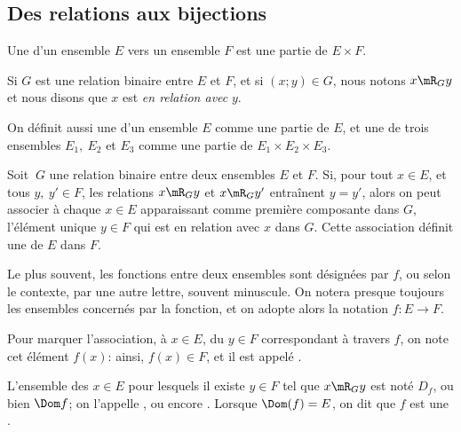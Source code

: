 \subsection{Des relations aux bijections}
\label{SUBooRelFctBijections}

\begin{definition}        \label{DEFooRFVTooUUuFuE}
	Une  d'un ensemble \( E\) vers un ensemble \( F\) est une partie de \( E\times F\).

	Si \( G\) est une relation binaire entre \( E\) et \( F\), et si \( (x; y) \in G \), nous notons \( x\mR_G y\) et nous disons que \( x\) est \emph{en relation avec} \( y\).

	On définit aussi une  d'un ensemble \( E \) comme une partie de \( E \), et une  de trois ensembles \( E_1,\ E_2 \) et \( E_3 \) comme une partie de \( E_1 \times E_2 \times E_3 \).
\end{definition}

\begin{definition}\label{DefooApplicFct}
	Soit \(\ G\) une relation binaire entre deux ensembles \(E\) et \( F\). Si, pour tout \(x \in E\), et tous \(y,\ y' \in F\), les relations \(x\mR_G y\) et \(x\mR_G y'\) entraînent \( y = y'\), alors on peut associer à chaque \( x \in E\) apparaissant comme première composante dans \( G \), l'élément unique \(y \in F\) qui est en relation avec \(x\) dans \(G\). Cette association définit une  de \(E\) dans \(F\).

	Le plus souvent, les fonctions entre deux ensembles sont désignées par \(f \), ou selon le contexte, par une autre lettre, souvent minuscule. On notera presque toujours les ensembles concernés par la fonction, et on adopte alors la notation \( f: E \to F \).
 
	Pour marquer l'association, à \(x \in E \), du \(y \in F\) correspondant à travers \( f \), on note cet élément \( f(x) \): ainsi, \( f(x) \in F \), et il est appelé .

	L'ensemble des \( x \in E \) pour lesquels il existe \( y \in F\) tel que \(x\mR_G y\) est noté \(D_f \), ou bien \( \Dom f \); on l'appelle  , ou encore . Lorsque \(\Dom(f) = E\), on dit que \( f \) est une .
\end{definition}

